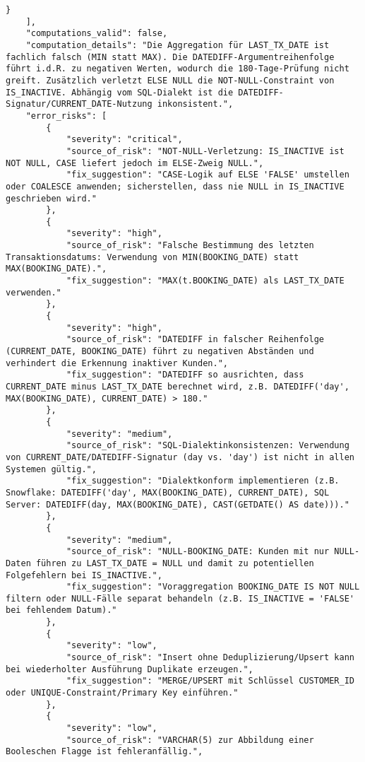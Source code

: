 \begin{lstlisting}[caption={Ausgabe: GPT-5 Anwendungsfall 7 Robustheitsdurchlauf},label={gpt_case7_prompt3}]
        }
    ],
    "computations_valid": false,
    "computation_details": "Die Aggregation für LAST_TX_DATE ist fachlich falsch (MIN statt MAX). Die DATEDIFF-Argumentreihenfolge führt i.d.R. zu negativen Werten, wodurch die 180-Tage-Prüfung nicht greift. Zusätzlich verletzt ELSE NULL die NOT-NULL-Constraint von IS_INACTIVE. Abhängig vom SQL-Dialekt ist die DATEDIFF-Signatur/CURRENT_DATE-Nutzung inkonsistent.",
    "error_risks": [
        {
            "severity": "critical",
            "source_of_risk": "NOT-NULL-Verletzung: IS_INACTIVE ist NOT NULL, CASE liefert jedoch im ELSE-Zweig NULL.",
            "fix_suggestion": "CASE-Logik auf ELSE 'FALSE' umstellen oder COALESCE anwenden; sicherstellen, dass nie NULL in IS_INACTIVE geschrieben wird."
        },
        {
            "severity": "high",
            "source_of_risk": "Falsche Bestimmung des letzten Transaktionsdatums: Verwendung von MIN(BOOKING_DATE) statt MAX(BOOKING_DATE).",
            "fix_suggestion": "MAX(t.BOOKING_DATE) als LAST_TX_DATE verwenden."
        },
        {
            "severity": "high",
            "source_of_risk": "DATEDIFF in falscher Reihenfolge (CURRENT_DATE, BOOKING_DATE) führt zu negativen Abständen und verhindert die Erkennung inaktiver Kunden.",
            "fix_suggestion": "DATEDIFF so ausrichten, dass CURRENT_DATE minus LAST_TX_DATE berechnet wird, z.B. DATEDIFF('day', MAX(BOOKING_DATE), CURRENT_DATE) > 180."
        },
        {
            "severity": "medium",
            "source_of_risk": "SQL-Dialektinkonsistenzen: Verwendung von CURRENT_DATE/DATEDIFF-Signatur (day vs. 'day') ist nicht in allen Systemen gültig.",
            "fix_suggestion": "Dialektkonform implementieren (z.B. Snowflake: DATEDIFF('day', MAX(BOOKING_DATE), CURRENT_DATE), SQL Server: DATEDIFF(day, MAX(BOOKING_DATE), CAST(GETDATE() AS date)))."
        },
        {
            "severity": "medium",
            "source_of_risk": "NULL-BOOKING_DATE: Kunden mit nur NULL-Daten führen zu LAST_TX_DATE = NULL und damit zu potentiellen Folgefehlern bei IS_INACTIVE.",
            "fix_suggestion": "Voraggregation BOOKING_DATE IS NOT NULL filtern oder NULL-Fälle separat behandeln (z.B. IS_INACTIVE = 'FALSE' bei fehlendem Datum)."
        },
        {
            "severity": "low",
            "source_of_risk": "Insert ohne Deduplizierung/Upsert kann bei wiederholter Ausführung Duplikate erzeugen.",
            "fix_suggestion": "MERGE/UPSERT mit Schlüssel CUSTOMER_ID oder UNIQUE-Constraint/Primary Key einführen."
        },
        {
            "severity": "low",
            "source_of_risk": "VARCHAR(5) zur Abbildung einer Booleschen Flagge ist fehleranfällig.",

\end{lstlisting}
